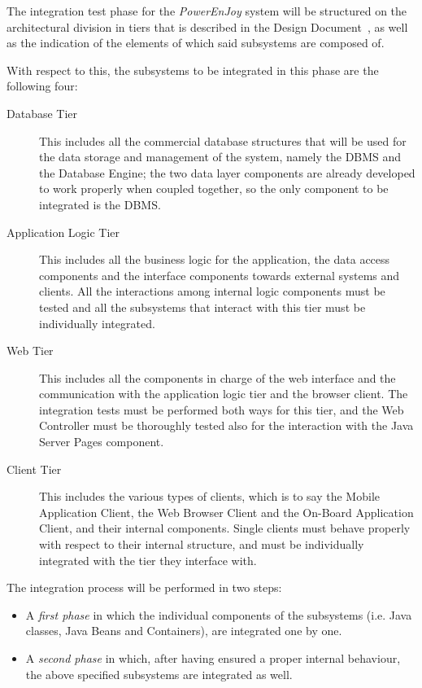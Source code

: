 The integration test phase for the \emph{PowerEnJoy} system will be structured on the architectural division in tiers that is described in the Design Document~\cite{dd}, as well as the indication of the elements of which said subsystems are composed of.

With respect to this, the subsystems to be integrated in this phase are the following four:
\begin{description}
\item[Database Tier] This includes all the commercial database structures that will be used for the data storage and management of the system, namely the DBMS and the Database Engine; the two data layer components are already developed to work properly when coupled together, so the only component to be integrated is the DBMS.
\item[Application Logic Tier] This includes all the business logic for the application, the data access components and the interface components towards external systems and clients. All the interactions among internal logic components must be tested and all the subsystems that interact with this tier must be individually integrated.
\item[Web Tier] This includes all the components in charge of the web interface and the communication with the application logic tier and the browser client. The integration tests must be performed both ways for this tier, and the Web Controller must be thoroughly tested also for the interaction with the Java Server Pages component.
\item[Client Tier] This includes the various types of clients, which is to say the Mobile Application Client, the Web Browser Client and the On-Board Application Client, and their internal components. Single clients must behave properly with respect to their internal structure, and must be individually integrated with the tier they interface with.
\end{description}

The integration process will be performed in two steps:
\begin{itemize}
\item A \emph{first phase} in which the individual components of the subsystems (i.e. Java classes, Java Beans and Containers), are integrated one by one.
\item A \emph{second phase} in which, after having ensured a proper internal behaviour, the above specified subsystems are integrated as well.
\end{itemize}